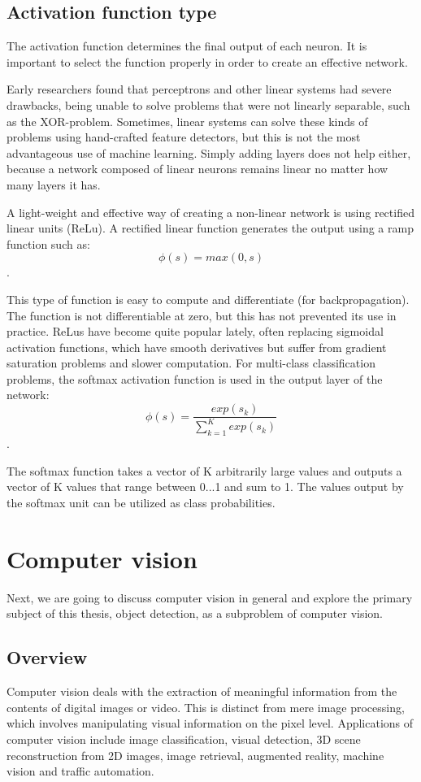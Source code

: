 \subsection{Activation function type}

The activation function  determines the final output of each neuron. It is important to select the function properly in order to create an effective network. 


Early researchers found that perceptrons and other linear systems had severe drawbacks, being unable to solve problems that were not linearly separable, such as the XOR-problem. Sometimes, linear systems can solve these kinds of problems using hand-crafted feature detectors, but this is not the most advantageous use of machine learning. Simply adding layers does not help either, because a network composed of linear neurons remains linear no matter how many layers it has.

A light-weight and effective way of creating a non-linear network is using rectified linear units (ReLu). A rectified linear function generates the output using a ramp function such as:\[\phi(s) = max(0,s)\].

This type of function is easy to compute and differentiate (for backpropagation). The function is not differentiable at zero, but this has not prevented its use in practice. ReLus have become quite popular lately, often replacing sigmoidal activation functions, which have smooth derivatives but suffer from gradient saturation problems and slower computation. For multi-class classification problems, the softmax activation function is used in the output layer of the network:\[\phi(s) = \frac{exp(s_{k})}{\sum_{k=1}^{K}exp(s_{k})}\].

The softmax function takes a vector of K arbitrarily large values and outputs a vector of K values that range between 0...1 and sum to 1. The values output by the softmax unit can be utilized as class probabilities.


\section{Computer vision}
Next, we are going to discuss computer vision in general and explore the primary subject of this thesis, object detection, as a subproblem of computer vision.

\subsection{Overview}
Computer vision deals with the extraction of meaningful information from the contents of digital images or video. This is distinct from mere image processing, which involves manipulating visual information on the pixel level. Applications of computer vision include image classification, visual detection, 3D scene reconstruction from 2D images, image retrieval, augmented reality, machine vision and traffic automation.

